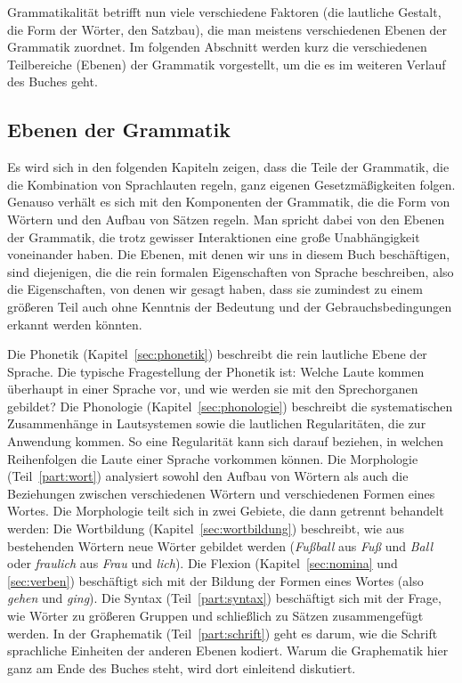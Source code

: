 Grammatikalität betrifft nun viele verschiedene Faktoren (\zB die lautliche Gestalt, die Form der Wörter, den Satzbau), die man meistens verschiedenen Ebenen der Grammatik zuordnet.
Im folgenden Abschnitt werden kurz die verschiedenen Teilbereiche (Ebenen) der Grammatik vorgestellt, um die es im weiteren Verlauf des Buches geht.

\subsection{Ebenen der Grammatik}

\label{sec:grebenen}


Es wird sich in den folgenden Kapiteln zeigen, dass die Teile der Grammatik, die \zB die Kombination von Sprachlauten regeln, ganz eigenen Gesetzmäßigkeiten folgen.
Genauso verhält es sich mit den Komponenten der Grammatik, die die Form von Wörtern und den Aufbau von Sätzen regeln.
Man spricht dabei von den Ebenen der Grammatik, die trotz gewisser Interaktionen eine große Unabhängigkeit voneinander haben.
Die Ebenen, mit denen wir uns in diesem Buch beschäftigen, sind diejenigen, die die rein formalen Eigenschaften von Sprache beschreiben, also die Eigenschaften, von denen wir gesagt haben, dass sie zumindest zu einem größeren Teil auch ohne Kenntnis der Bedeutung und der Gebrauchsbedingungen erkannt werden könnten.

Die Phonetik (Kapitel~\ref{sec:phonetik}) beschreibt die rein lautliche Ebene der Sprache.
Die typische Fragestellung der Phonetik ist:
Welche Laute kommen überhaupt in einer Sprache vor, und wie werden sie mit den Sprechorganen gebildet?
Die Phonologie (Kapitel~\ref{sec:phonologie}) beschreibt die systematischen Zusammenhänge in Lautsystemen sowie die lautlichen Regularitäten, die zur Anwendung kommen.
So eine Regularität kann sich \zB darauf beziehen, in welchen Reihenfolgen die Laute einer Sprache vorkommen können.
Die Morphologie (Teil~\ref{part:wort}) analysiert sowohl den Aufbau von Wörtern als auch die Beziehungen zwischen verschiedenen Wörtern und verschiedenen Formen eines Wortes.
Die Morphologie teilt sich in zwei Gebiete, die dann getrennt behandelt werden:
Die Wortbildung (Kapitel~\ref{sec:wortbildung}) beschreibt, wie aus bestehenden Wörtern neue Wörter gebildet werden (\zB \textit{Fußball} aus \textit{Fuß} und \textit{Ball} oder \textit{fraulich} aus \textit{Frau} und \textit{lich}).
Die Flexion (Kapitel~\ref{sec:nomina} und \ref{sec:verben}) beschäftigt sich mit der Bildung der Formen eines Wortes (also \zB \textit{gehen} und \textit{ging}). 
Die Syntax (Teil~\ref{part:syntax}) beschäftigt sich mit der Frage, wie Wörter zu größeren Gruppen und schließlich zu Sätzen zusammengefügt werden.
In der Graphematik (Teil~\ref{part:schrift}) geht es darum, wie die Schrift sprachliche Einheiten der anderen Ebenen kodiert.
Warum die Graphematik hier ganz am Ende des Buches steht, wird dort einleitend diskutiert.

